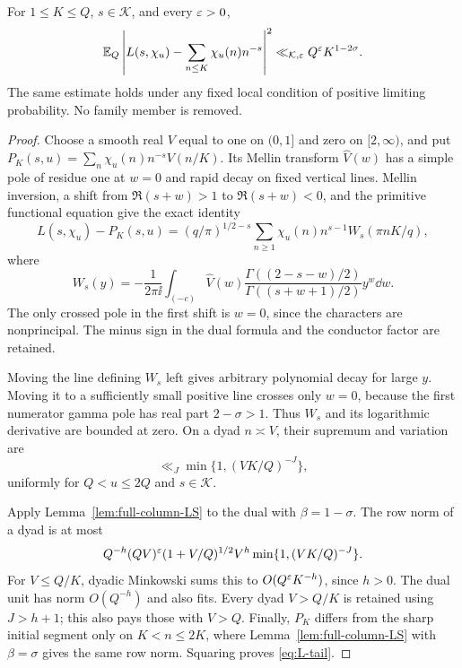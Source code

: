 \begin{theorem}\label{thm:L-tail}
For $1\le K\le Q$, $s\in\mathcal K$, and every $\varepsilon>0$,
\begin{equation}\label{eq:L-tail}
 \mathbb E_Q\left|L(s,\chi_u)-\sum_{n\le K}\chi_u(n)n^{-s}\right|^2
 \ll_{\mathcal K,\varepsilon} Q^\varepsilon K^{1-2\sigma}.
\end{equation}
The same estimate holds under any fixed local condition of positive limiting probability. No family member is removed.
\end{theorem}
\begin{proof}
Choose a smooth real $V$ equal to one on $(0,1]$ and zero on $[2,\infty)$, and put $P_K(s,u)=\sum_n\chi_u(n)n^{-s}V(n/K)$. Its Mellin transform $\widehat V(w)$ has a simple pole of residue one at $w=0$ and rapid decay on fixed vertical lines. Mellin inversion, a shift from $\Re(s+w)>1$ to $\Re(s+w)<0$, and the primitive functional equation give the exact identity
\begin{equation}\label{eq:flat-FE}
 L(s,\chi_u)-P_K(s,u)
 =(q/\pi)^{1/2-s}\sum_{n\ge1}\chi_u(n)n^{s-1}
                   W_s(\pi nK/q),
\end{equation}
where
\[
 W_s(y)=-\frac1{2\pi\ii}\int_{(-c)}\widehat V(w)
   \frac{\Gamma((2-s-w)/2)}{\Gamma((s+w+1)/2)}y^w\dd w.
\]
The only crossed pole in the first shift is $w=0$, since the characters are nonprincipal. The minus sign in the dual formula and the conductor factor are retained.

Moving the line defining $W_s$ left gives arbitrary polynomial decay for large $y$. Moving it to a sufficiently small positive line crosses only $w=0$, because the first numerator gamma pole has real part $2-\sigma>1$. Thus $W_s$ and its logarithmic derivative are bounded at zero. On a dyad $n\asymp V$, their supremum and variation are
\[
 \ll_J\min\{1,(VK/Q)^{-J}\},
\]
uniformly for $Q<u\le2Q$ and $s\in\mathcal K$.

Apply Lemma~\ref{lem:full-column-LS} to the dual with $\beta=1-\sigma$. The row norm of a dyad is at most
\[
 Q^{-h}(QV)^\varepsilon(1+V/Q)^{1/2}V^h
                   \min\{1,(VK/Q)^{-J}\}.
\]
For $V\le Q/K$, dyadic Minkowski sums this to $O(Q^\varepsilon K^{-h})$, since $h>0$. The dual unit has norm $O(Q^{-h})$ and also fits. Every dyad $V>Q/K$ is retained using $J>h+1$; this also pays those with $V>Q$. Finally, $P_K$ differs from the sharp initial segment only on $K<n\le2K$, where Lemma~\ref{lem:full-column-LS} with $\beta=\sigma$ gives the same row norm. Squaring proves \eqref{eq:L-tail}.
\end{proof}

